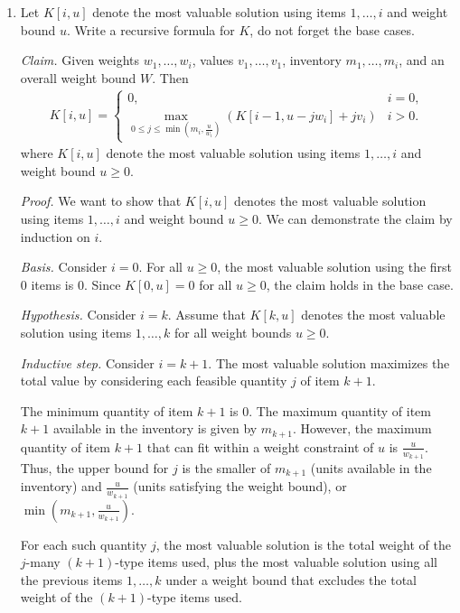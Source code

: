 \begin{enumerate}
    \item Let $K[i,u]$ denote the most valuable solution using items $1,\ldots,i$ and weight bound $u$. Write a recursive formula for $K$, do not forget the base cases.

\begin{solution}
\textit{Claim. }Given weights $w_1,\dots,w_i$, values $v_1,\dots,v_1$, inventory $m_1,\dots,m_i$, and an overall weight bound $W$. Then
\begin{align*}
K[i,u]=\begin{cases}
0,&i=0,\\
{\underset{0\leq j\leq\min\left(m_i,\frac{u}{w_i}\right)}{\max}}\left(K[i-1,u-jw_i]+jv_i\right)&i>0.
\end{cases}
\end{align*}
where $K[i,u]$ denote the most valuable solution using items $1,\dots,i$ and weight bound $u\geq 0$. 

\textit{Proof. }We want to show that $K[i,u]$ denotes the most valuable solution using items $1,\dots,i$ and weight bound $u\geq 0$. We can demonstrate the claim by induction on $i$.

\textit{Basis. }Consider $i=0$. For all $u\geq 0$, the most valuable solution using the first $0$ items is $0$. Since $K[0,u]=0$ for all $u\geq 0$, the claim holds in the base case.

\textit{Hypothesis. }Consider $i=k$. Assume that $K[k,u]$ denotes the most valuable solution using items $1,\dots,k$ for all weight bounds $u\geq 0$.

\textit{Inductive step. }Consider $i=k+1$. The most valuable solution maximizes the total value by considering each feasible quantity $j$ of item $k+1$.

The minimum quantity of item $k+1$ is $0$. The maximum quantity of item $k+1$ available in the inventory is given by $m_{k+1}$. However, the maximum quantity of item $k+1$ that can fit within a weight constraint of $u$ is $\frac{u}{w_{k+1}}$. Thus, the upper bound for $j$ is the smaller of $m_{k+1}$ (units available in the inventory) and $\frac{u}{w_{k+1}}$ (units satisfying the weight bound), or $\min\left(m_{k+1},\frac{u}{w_{k+1}}\right)$.

For each such quantity $j$, the most valuable solution is the total weight of the $j$-many $(k+1)$-type items used, plus the most valuable solution using all the previous items $1,\dots,k$ under a weight bound that excludes the total weight of the $(k+1)$-type items used. 


\end{solution}
\end{enumerate}
